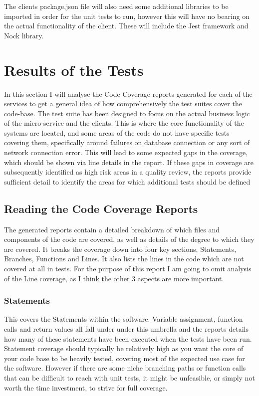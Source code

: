 The clients package.json file will also need some additional libraries to be imported in order for the unit tests to run, however this will have no bearing on the actual functionality of the client. These will include the Jest framework and Nock library.
\section{Results of the Tests}
In this section I will analyse the Code Coverage reports generated for each of the services to get a general idea of how comprehensively the test suites cover the code-base. The test suite has been designed to focus on the actual business logic of the micro-service and the clients. This is where the core functionality of the systems are located, and some areas of the code do not have specific tests covering them, specifically around failures on database connection or any sort of network connection error. This will lead to some expected gaps in the coverage, which should be shown via line details in the report. If these gaps in coverage are subsequently identified as high risk areas in a quality review, the reports provide sufficient detail to identify the areas for which additional tests should be defined
\subsection{Reading the Code Coverage Reports}
The generated reports contain a detailed breakdown of which files and components of the code are covered, as well as details of the degree to which they are covered. It breaks the coverage down into four key sections, Statements, Branches, Functions and Lines. It also lists the lines in the code which are not covered at all in tests. For the purpose of this report I am going to omit analysis of the Line coverage, as I think the other 3 aspects are more important.
\subsubsection{Statements}
This covers the Statements within the software. Variable assignment, function calls and return values all fall under under this umbrella and the reports details how many of these statements have been executed when the tests have been run. Statement coverage should typically be relatively high as you want the core of your code base to be heavily tested, covering most of the expected use case for the software. However if there are some niche branching paths or function calls that can be difficult to reach with unit tests, it might be unfeasible, or simply not worth the time investment, to strive for full coverage.
